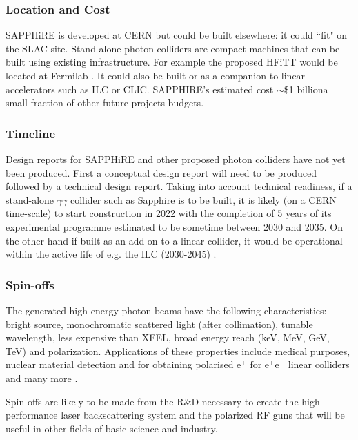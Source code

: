\subsubsection{Location and Cost}
SAPPHiRE is developed at CERN but could be built elsewhere: it could ``fit" on the SLAC site. Stand-alone photon colliders are compact machines that can be built using existing infrastructure. For example the proposed HFiTT would be located at Fermilab \cite{Chou:Higgs}. It could also be built or as a companion to linear accelerators such as ILC or CLIC. SAPPHIRE's estimated cost $\sim$\$1 billion\textemdash a small fraction of other future projects budgets. 

\subsubsection{Timeline}
Design reports for SAPPHiRE and other proposed photon colliders have not yet been produced. First a conceptual design report will need to be produced followed by a technical design report. 
Taking into account technical readiness, if a stand-alone $\gamma\gamma$ collider such as Sapphire is to be built, it is likely (on a CERN time-scale) to start construction in 2022 with the completion of 5 years of its experimental programme estimated to be sometime between 2030 and 2035. On the other hand if built as an add-on to a linear collider, it would be operational within the active life of e.g. the ILC (2030-2045) \cite{Blondel:HiggsF}.

\subsubsection{Spin-offs}
The generated high energy photon beams have the following characteristics: bright source, monochromatic scattered light (after collimation), tunable wavelength, less expensive than XFEL, broad energy reach (keV, MeV, GeV, TeV) and polarization. Applications of these properties include medical purposes, nuclear material detection and for obtaining polarised e$^{+}$ for e$^{+}$e$^{-}$ linear colliders and many more \cite{Telnov:Overview}.

Spin-offs are likely to be made from the R\&D necessary to create the high-performance laser backscattering system and the polarized RF guns that will be useful in other fields of basic science and industry.

